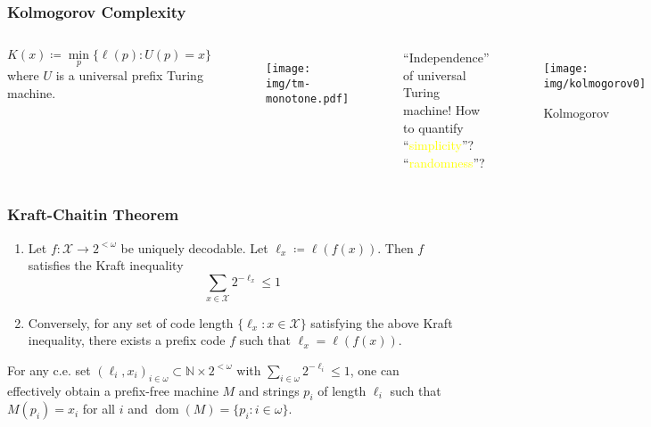 \documentclass[UTF8,11pt,colorlinks,compress,openany]{beamer}%
\begin{document}
\begin{frame}\frametitle{Kolmogorov Complexity}
\setlength\abovedisplayskip{0pt}
\setlength\belowdisplayskip{0pt}
	\begin{columns}
			\begin{definition}
				\[K(x)\coloneqq \min\limits_p\{\ell(p): U(p)=x\}\]
				where $U$ is a universal prefix Turing machine.
			\end{definition}
\begin{figure}[H]\centering
\texttt{[image: img/tm-monotone.pdf]}
\end{figure}
			``Independence'' of universal Turing machine!
			\centering How to quantify ``\textcolor{yellow}{simplicity}''? ``\textcolor{yellow}{randomness}''?
			\begin{figure}
				\texttt{[image: img/kolmogorov0]}\caption{Kolmogorov}
			\end{figure}
	\end{columns}
\end{frame}

\begin{frame}\frametitle{Kraft-Chaitin Theorem}
\begin{theorem}
\begin{enumerate}
	\item Let $f:\mathcal{X}\to 2^{<\omega}$ be uniquely decodable. Let $\ell_x\coloneqq \ell(f(x))$. Then $f$ satisfies the Kraft inequality
	\[\sum\limits_{x\in\mathcal{X}}2^{-\ell_x}\leq 1\]
	\item Conversely, for any set of code length $\{\ell_x: x\in\mathcal{X}\}$ satisfying the above Kraft inequality, there exists a prefix code $f$ such that $\ell_x=\ell(f(x))$.
\end{enumerate}
\end{theorem}
\begin{theorem}
For any c.e. set $(\ell_i,x_i)_{i\in\omega}\subset\mathbb{N}\times 2^{<\omega}$ with $\sum\limits_{i\in\omega}2^{-\ell_i}\leq 1$, one can effectively obtain a prefix-free machine $M$ and strings $p_i$ of length $\ell_i$ such that $M(p_i)=x_i$ for all $i$ and $\operatorname{dom}(M)=\{p_i: i\in\omega\}$.
\end{theorem}
\end{frame}
\end{document}
